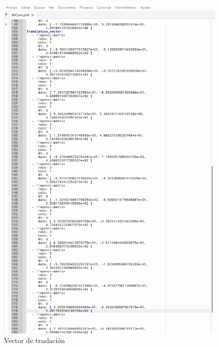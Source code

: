     \begin{figure}[p]
    \centering
    \includegraphics[scale = 0.35]{capitulo_04/figuras_dir/par2.jpg}
    \caption{Vector de traslación}
    \label{fig: micam2}
    \end{figure}
    
